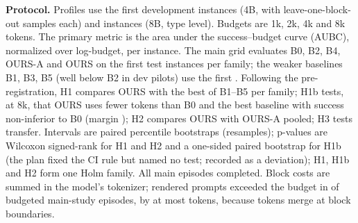 \textbf{Protocol.} Profiles use the first \RNProfFour development instances (4B, with \RNLobo leave-one-block-out samples
each) and \RNProfEight instances (8B, type level). Budgets are 1k, 2k, 4k and 8k tokens. The primary metric is the area
under the success--budget curve (AUBC), normalized over log-budget, per instance. The main grid evaluates B0, B2, B4,
OURS-A and OURS on the first \RNMain test instances per family; the weaker baselines B1, B3, B5 (well below B2 in dev
pilots) use the first \RNWeak. Following the pre-registration, H1 compares OURS with the best of B1--B5 per family; H1b
tests, at 8k, that OURS uses fewer tokens than B0 and the best baseline with success non-inferior to B0 (margin
\RMargin); H2 compares OURS with OURS-A pooled; H3 tests transfer. Intervals are paired percentile bootstraps
(\RNBoot resamples); p-values are Wilcoxon signed-rank for H1 and H2 and a one-sided paired bootstrap for H1b (the plan fixed the CI rule but named no test; recorded as a deviation); H1, H1b and H2
form one Holm family. All \RMainEpisodes main episodes completed. Block costs are summed in the model's tokenizer;
rendered prompts exceeded the budget in \ROverBudgetMain of \RBudgetedMain budgeted main-study episodes, by at most
\RMaxOvershoot tokens, because tokens merge at block boundaries.

